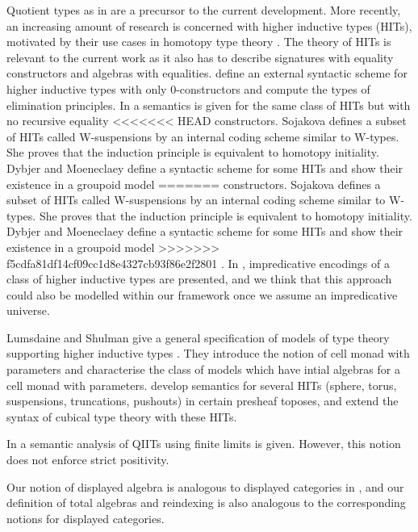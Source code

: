 \documentclass[acmsmall,review,anonymous]{acmart}\settopmatter{printfolios=true,printccs=false,printacmref=false}
\begin{document}
Quotient types as in \cite{hofmann95extensional} are a precursor to
the current development. More recently, an increasing amount of
research is concerned with higher inductive types (HITs), motivated by
their use cases in homotopy type theory \cite{HoTTbook}. The theory of
HITs is relevant to the current work as it also has to describe
signatures with equality constructors and algebras with
equalities. \cite{niels} define an external syntactic scheme for
higher inductive types with only 0-constructors and compute the types
of elimination principles. In \cite{nielsmsc} a semantics is given for
the same class of HITs but with no recursive equality
<<<<<<< HEAD
constructors. Sojakova \cite{sojakova} defines a subset of HITs called
W-suspensions by an internal coding scheme similar to W-types. She
proves that the induction principle is equivalent to homotopy
initiality. Dybjer and Moeneclaey define a syntactic scheme for some
HITs and show their existence in a groupoid model
=======
constructors. Sojakova \cite{sojakova} defines a subset of HITs
called W-suspensions by an internal coding scheme similar to
W-types. She proves that the induction principle is equivalent to
homotopy initiality. Dybjer and Moeneclaey define a syntactic scheme
for some HITs
and show their existence in a groupoid model
>>>>>>> f5cdfa81df14cf09cc1d8e4327cb93f86e2f2801
\cite{moeneclaey}. In \cite{AwodeyFS18}, impredicative encodings of a
class of higher inductive types are presented, and we think that this
approach could also be modelled within our framework once we assume an
impredicative universe.

Lumsdaine and Shulman give a general specification of
models of type theory supporting higher inductive types
\cite{lumsdaineShulman}. They introduce the notion of cell monad with
parameters and characterise the class of models which have intial
algebras for a cell monad with parameters. \cite{cubicalhits} develop
semantics for several HITs (sphere, torus, suspensions, truncations,
pushouts) in certain presheaf toposes, and extend the syntax of
cubical type theory \cite{ctt} with these HITs.

In \cite{altenkirch2018quotient} a
semantic analysis of QIITs using finite limits is given. However, this
notion does not enforce strict positivity.

Our notion of displayed algebra is analogous to displayed categories
in \cite{displayedCategories}, and our definition of total algebras
and reindexing is also analogous to the corresponding notions for
displayed categories.
\end{document}

